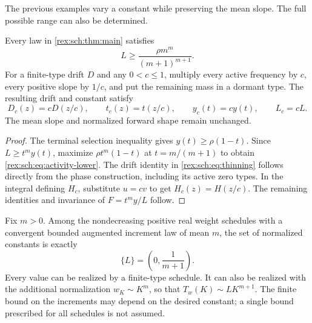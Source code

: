The previous examples vary a constant while preserving the mean
slope. The full possible range can also be determined.

\begin{proposition}\label{rex:sch:prop:scaling}
Every law in \cref{rex:sch:thm:main} satisfies
\begin{equation}\label{rex:sch:eq:activity-lower}
 L\geq\frac{\rho m^m}{(m+1)^{m+1}}.
\end{equation}
For a finite-type drift $D$ and any $0<c\leq1$, multiply every
active frequency by $c$, every positive slope by $1/c$, and put
the remaining mass in a dormant type. The resulting drift and
constant satisfy
\begin{equation}\label{rex:sch:eq:thinning}
 D_c(z)=cD(z/c),\qquad
 t_c(z)=t(z/c),\qquad y_c(t)=cy(t),\qquad L_c=cL.
\end{equation}
The mean slope and normalized forward shape remain unchanged.
\end{proposition}

\begin{proof}
The terminal selection inequality gives
$y(t)\geq\rho(1-t)$. Since $L\geq t^my(t)$, maximize
$\rho t^m(1-t)$ at $t=m/(m+1)$ to obtain
\eqref{rex:sch:eq:activity-lower}. The drift identity in
\eqref{rex:sch:eq:thinning} follows directly from the phase construction,
including its active zero types. In the integral defining $H_c$,
substitute $u=cv$ to get $H_c(z)=H(z/c)$. The remaining
identities and invariance of $F=t^my/L$ follow.
\end{proof}

\begin{theorem}
\label{rex:sch:thm:spectrum}
Fix $m>0$. Among the nondecreasing positive real weight schedules
with a convergent bounded augmented increment law of mean $m$,
the set of normalized constants is exactly
\begin{equation}\label{rex:sch:eq:spectrum}
 \boxed{\displaystyle \{L\}=\left(0,\frac1{m+1}\right).}
\end{equation}
Every value can be realized by a finite-type schedule. It can
also be realized with the additional normalization $w_K\sim K^m$,
so that $T_w(K)\sim L K^{m+1}$.
The finite bound on the increments may depend on the desired
constant; a single bound prescribed for all schedules is not assumed.
\end{theorem}

